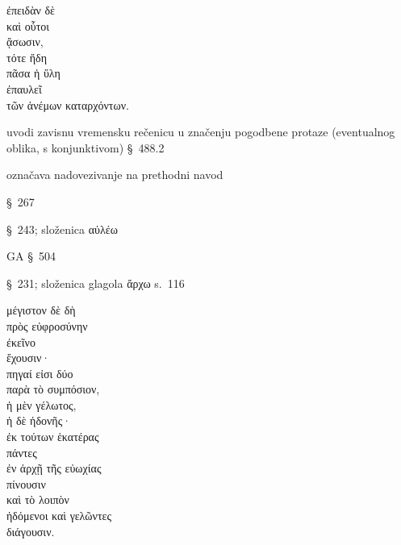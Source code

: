 

{\large
\begin{greek}
\noindent ἐπειδὰν δὲ \\
καὶ οὗτοι \\
ᾄσωσιν, \\
τότε ἤδη \\
πᾶσα ἡ ὕλη\\
ἐπαυλεῖ \\
\tabto{2em} τῶν ἀνέμων καταρχόντων. \\

\end{greek}
}

\begin{description}[noitemsep]
\item[ἐπειδὰν] uvodi zavisnu vremensku rečenicu u značenju pogodbene protaze (eventualnog oblika, s konjunktivom) §~488.2
\item[δὲ] označava nadovezivanje na prethodni navod
\item[ᾄσωσιν] §~267
\item[ἐπαυλεῖ] §~243; složenica αὐλέω
\item[τῶν ἀνέμων καταρχόντων] GA §~504
\item[καταρχόντων] §~231; složenica glagola ἄρχω s.~116
\end{description}



{\large
\begin{greek}
\noindent μέγιστον δὲ δὴ \\
\tabto{2em} πρὸς εὐφροσύνην \\
ἐκεῖνο \\
ἔχουσιν· \\
πηγαί εἰσι δύο \\
\tabto{2em} παρὰ τὸ συμπόσιον, \\
ἡ μὲν γέλωτος, \\
ἡ δὲ ἡδονῆς· \\
\tabto{2em} ἐκ τούτων ἑκατέρας\\
πάντες \\
\tabto{2em} ἐν ἀρχῇ τῆς εὐωχίας \\
πίνουσιν \\
καὶ τὸ λοιπὸν \\
ἡδόμενοι καὶ γελῶντες \\
διάγουσιν.\\

\end{greek}
}

